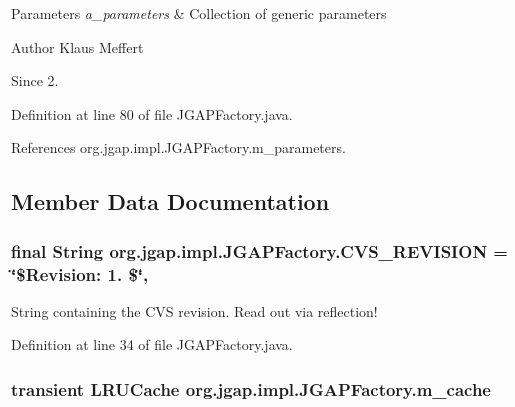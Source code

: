 \begin{DoxyParams}{Parameters}
{\em a\-\_\-parameters} & Collection of generic parameters\\
\hline
\end{DoxyParams}
\begin{DoxyAuthor}{Author}
Klaus Meffert 
\end{DoxyAuthor}
\begin{DoxySince}{Since}
2. 
\end{DoxySince}


Definition at line 80 of file J\-G\-A\-P\-Factory.\-java.



References org.\-jgap.\-impl.\-J\-G\-A\-P\-Factory.\-m\-\_\-parameters.



\subsection{Member Data Documentation}
\hypertarget{classorg_1_1jgap_1_1impl_1_1_j_g_a_p_factory_aab2b45f2c63fb02ec26ffdc07213c29d}{
\subsubsection[{C\-V\-S\-\_\-\-R\-E\-V\-I\-S\-I\-O\-N}]{\setlength{\rightskip}{0pt plus 5cm}final String org.\-jgap.\-impl.\-J\-G\-A\-P\-Factory.\-C\-V\-S\-\_\-\-R\-E\-V\-I\-S\-I\-O\-N = \char`\"{}\$Revision\-: 1. \$\char`\"{}\hspace{0.3cm}{\ttfamily [static]}, {\ttfamily [private]}}}\label{classorg_1_1jgap_1_1impl_1_1_j_g_a_p_factory_aab2b45f2c63fb02ec26ffdc07213c29d}
String containing the C\-V\-S revision. Read out via reflection! 

Definition at line 34 of file J\-G\-A\-P\-Factory.\-java.

\hypertarget{classorg_1_1jgap_1_1impl_1_1_j_g_a_p_factory_a911c06721c6b6d8f4bc21d9cb6125595}{
\subsubsection[{m\-\_\-cache}]{\setlength{\rightskip}{0pt plus 5cm}transient L\-R\-U\-Cache org.\-jgap.\-impl.\-J\-G\-A\-P\-Factory.\-m\-\_\-cache\hspace{0.3cm}{\ttfamily [private]}}}\label{classorg_1_1jgap_1_1impl_1_1_j_g_a_p_factory_a911c06721c6b6d8f4bc21d9cb6125595}


